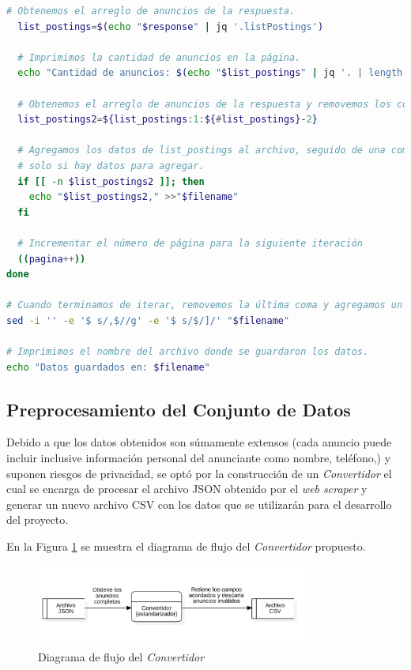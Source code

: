 \begin{lstlisting}[language=bash, caption={Código fuente del \textit{web scraper}}, label={lst:web_scraper}]
  # Obtenemos el arreglo de anuncios de la respuesta.
  list_postings=$(echo "$response" | jq '.listPostings')

  # Imprimimos la cantidad de anuncios en la página.
  echo "Cantidad de anuncios: $(echo "$list_postings" | jq '. | length')"

  # Obtenemos el arreglo de anuncios de la respuesta y removemos los corchetes iniciales y finales.
  list_postings2=${list_postings:1:${#list_postings}-2}

  # Agregamos los datos de list_postings al archivo, seguido de una coma para separarlo del siguiente set de datos,
  # solo si hay datos para agregar.
  if [[ -n $list_postings2 ]]; then
    echo "$list_postings2," >>"$filename"
  fi

  # Incrementar el número de página para la siguiente iteración
  ((pagina++))
done

# Cuando terminamos de iterar, removemos la última coma y agregamos un corchete final.
sed -i '' -e '$ s/,$//g' -e '$ s/$/]/' "$filename"

# Imprimimos el nombre del archivo donde se guardaron los datos.
echo "Datos guardados en: $filename"
\end{lstlisting}

\subsection{Preprocesamiento del Conjunto de Datos}

Debido a que los datos obtenidos son súmamente extensos (cada anuncio puede
incluir inclusive información personal del anunciante como nombre, teléfono,) y
suponen riesgos de privacidad, se optó por la construcción de un \textit{Convertidor}
el cual se encarga de procesar el archivo JSON obtenido por el \textit{web scraper}
y generar un nuevo archivo CSV con los datos que se utilizarán para el desarrollo
del proyecto.

En la Figura \ref{fig:arquitectura-conversor} se muestra el diagrama de flujo del
\textit{Convertidor} propuesto.

\begin{figure}[H]
    \centering
    \includegraphics[width=0.8\textwidth]{imagenes/04-diseno/arquitectura-convertidor.png}
    \caption{Diagrama de flujo del \textit{Convertidor}}
    \label{fig:arquitectura-conversor}
\end{figure}

